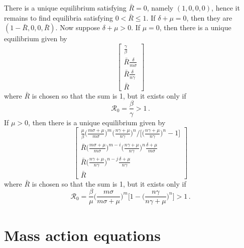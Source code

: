 \documentclass[fleqn]{article}
\begin{document}
There is a unique equilibrium satisfying $\bar{R} = 0$,
namely $(1, 0, 0, 0)$,
hence it remains to find equilibria satisfying $0 < \bar{R} \leq 1$.
If $\delta + \mu = 0$, then they are $(1 - \bar{R}, 0, 0, \bar{R})$.
Now suppose $\delta + \mu > 0$.  If $\mu = 0$, then there is a
unique equilibrium given by
\begin{equation}
\begin{bmatrix}
  \frac{\gamma}{\beta} \\
  \bar{R} \frac{\delta}{m \sigma} \\
  \bar{R} \frac{\delta}{n \gamma} \\
  \bar{R}
\end{bmatrix}
\end{equation}
where $\bar{R}$ is chosen so that the sum is 1, but it exists only if
\begin{equation}
\mathcal{R}_{0} = \frac{\beta}{\gamma} > 1\,.
\end{equation}
If $\mu > 0$, then there is a unique equilibrium given by
\begin{equation}
\begin{bmatrix}
  \left.\frac{\mu}{\beta} \big(\frac{m \sigma + \mu}{m \sigma}\big)^{m} \big(\frac{n \gamma + \mu}{n \gamma}\big)^{n} \big/ \big[\big(\frac{n \gamma + \mu}{n \gamma}\big)^{n} - 1\big]\right. \\
  \bar{R} \big(\frac{m \sigma + \mu}{m \sigma}\big)^{m - i} \big(\frac{n \gamma + \mu}{n \gamma}\big)^{n} \frac{\delta + \mu}{m \sigma} \\
  \bar{R} \big(\frac{n \gamma + \mu}{n \gamma}\big)^{n - j} \frac{\delta + \mu}{n \gamma} \\
  \bar{R}
\end{bmatrix}
\end{equation}
where $\bar{R}$ is chosen so that the sum is 1, but it exists only if
\begin{equation}
\mathcal{R}_{0} = \frac{\beta}{\mu} \Big(\frac{m \sigma}{m \sigma + \mu}\Big)^{m} \Big[1 - \Big(\frac{n \gamma}{n \gamma + \mu}\Big)^{n}\Big] > 1\,.
\end{equation}


\section{Mass action equations}
\end{document}

